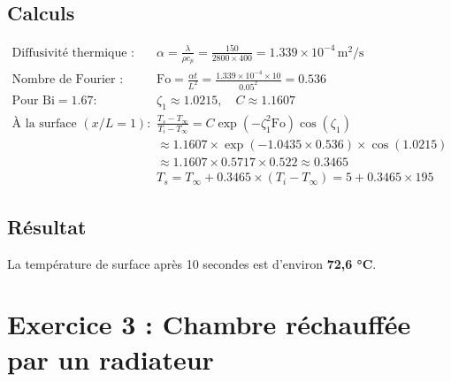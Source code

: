 \documentclass{rapportECL}
\begin{document}
\subsection*{Calculs}
\begin{align*}
\text{Diffusivité thermique : } & \alpha = \frac{\lambda}{\rho c_p} = \frac{150}{2800 \times 400} = 1.339 \times 10^{-4} \, \text{m}^2/\text{s} \\
\text{Nombre de Fourier : } & \text{Fo} = \frac{\alpha t}{L^2} = \frac{1.339 \times 10^{-4} \times 10}{0.05^2} = 0.536 \\
\text{Pour } \text{Bi} = 1.67 : & \zeta_1 \approx 1.0215, \quad C \approx 1.1607 \\
\text{À la surface } (x/L = 1) : & \frac{T_s - T_{\infty}}{T_i - T_{\infty}} = C \exp(-\zeta_1^2 \text{Fo}) \cos(\zeta_1) \\
& \approx 1.1607 \times \exp(-1.0435 \times 0.536) \times \cos(1.0215) \\
& \approx 1.1607 \times 0.5717 \times 0.522 \approx 0.3465 \\
& T_s = T_{\infty} + 0.3465 \times (T_i - T_{\infty}) = 5 + 0.3465 \times 195
\end{align*}

\subsection*{Résultat}
La température de surface après 10 secondes est d'environ \textbf{72,6 °C}.

\section{Exercice 3 : Chambre réchauffée par un radiateur}
\end{document}
